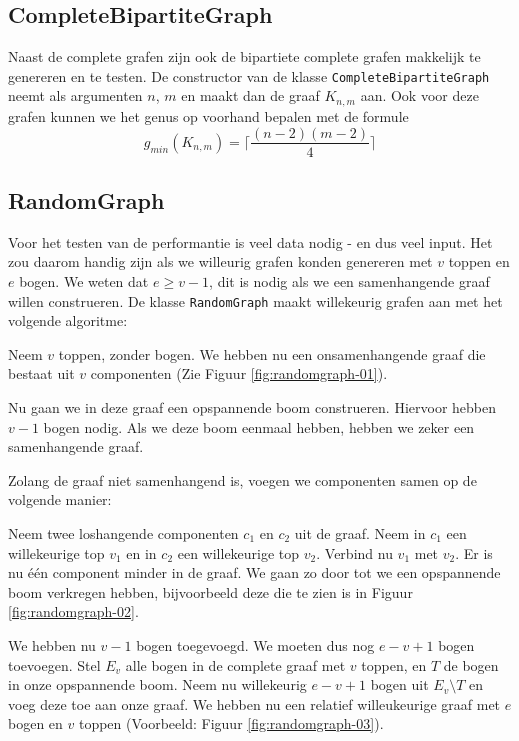 \documentclass{article}
\begin{document}
\subsection{CompleteBipartiteGraph}
\label{complete-bipartite-graph}
Naast de complete grafen zijn ook de bipartiete complete grafen makkelijk te
genereren en te testen. De constructor van de klasse
\verb#CompleteBipartiteGraph# neemt als argumenten $n$, $m$ en maakt dan de
graaf $K_{n,m}$ aan. Ook voor deze grafen kunnen we het genus op voorhand
bepalen met de formule
\begin{equation*}
g_{min}(K_{n,m}) = \lceil \frac{(n - 2) (m - 2)}{4} \rceil
\end{equation*}

\subsection{RandomGraph}
Voor het testen van de performantie is veel data nodig - en dus veel input. Het
zou daarom handig zijn als we willeurig grafen konden genereren met $v$ toppen
en $e$ bogen. We weten dat $e \geq v - 1$, dit is nodig als we een samenhangende
graaf willen construeren.  De klasse \verb#RandomGraph# maakt willekeurig grafen
aan met het volgende algoritme:
\newline

Neem $v$ toppen, zonder bogen. We hebben nu een onsamenhangende graaf die
bestaat uit $v$ componenten (Zie Figuur \ref{fig:randomgraph-01}).
\newline

Nu gaan we in deze graaf een opspannende boom construeren. Hiervoor hebben
$v - 1$ bogen nodig. Als we deze boom eenmaal hebben, hebben we zeker een
samenhangende graaf. 
\newline

Zolang de graaf niet samenhangend is, voegen we componenten samen op de volgende
manier:
\newline

Neem twee loshangende componenten $c_1$ en $c_2$ uit de graaf. Neem in $c_1$ een
willekeurige top $v_1$ en in $c_2$ een willekeurige top $v_2$. Verbind nu $v_1$
met $v_2$. Er is nu \'e\'en component minder in de graaf. We gaan zo door tot
we een opspannende boom verkregen hebben, bijvoorbeeld deze die te zien is in
Figuur \ref{fig:randomgraph-02}.
\newline

We hebben nu $v - 1$ bogen toegevoegd. We moeten dus nog $e - v + 1$ bogen
toevoegen. Stel $E_v$ alle bogen in de complete graaf met $v$ toppen, en $T$ de
bogen in onze opspannende boom. Neem nu willekeurig $e - v + 1$ bogen uit
$E_v \setminus T$ en voeg deze toe aan onze graaf. We hebben nu een relatief
willeukeurige graaf met $e$ bogen en $v$ toppen (Voorbeeld: Figuur
\ref{fig:randomgraph-03}).
\end{document}
